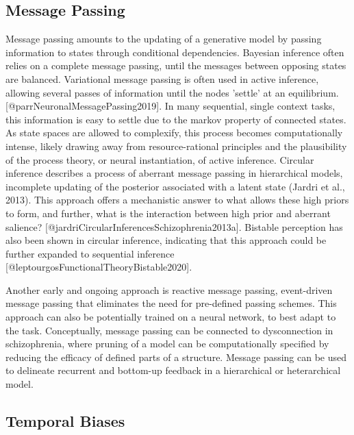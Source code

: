 \documentclass{article}
\begin{document}
\subsection{Message Passing}

Message passing amounts to the updating of a generative model by passing information to states through conditional dependencies. Bayesian inference often relies on a complete message passing, until the messages between opposing states are balanced. Variational message passing is often used in active inference, allowing several passes of information until the nodes 'settle' at an equilibrium. [@parrNeuronalMessagePassing2019]. In many sequential, single context tasks, this information is easy to settle due to the markov property of connected states. As state spaces are allowed to complexify, this process becomes computationally intense, likely drawing away from resource-rational principles and the plausibility of the process theory, or neural instantiation, of active inference.
Circular inference describes a process of aberrant message passing in hierarchical models, incomplete updating of the posterior associated with a latent state (Jardri et al., 2013). This approach offers a mechanistic answer to what allows these high priors to form, and further, what is the interaction between high prior and aberrant salience? [@jardriCircularInferencesSchizophrenia2013a]. Bistable perception has also been shown in circular inference, indicating that this approach could be further expanded to sequential inference [@leptourgosFunctionalTheoryBistable2020].

Another early and ongoing approach is reactive message passing, event-driven message passing that eliminates the need for pre-defined passing schemes. This approach can also be potentially trained on a neural network, to best adapt to the task. Conceptually, message passing can be connected to dysconnection in schizophrenia, where pruning of a model can be computationally specified by reducing the efficacy of defined parts of a structure. Message passing can be used to delineate recurrent and bottom-up feedback in a hierarchical or heterarchical model.

\subsection{Temporal Biases}
\end{document}
